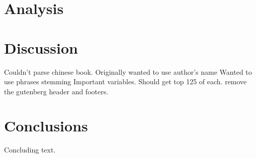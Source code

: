 \documentclass[11pt]{article}
\begin{document}
\section{Analysis}

\section{Discussion}

Couldn't parse chinese book.
Originally wanted to use author's name
Wanted to use phrases
stemming
Important variables.
Should get top 125 of each.
remove the gutenberg header and footers.

\section{Conclusions}

Concluding text.



\end{document}
